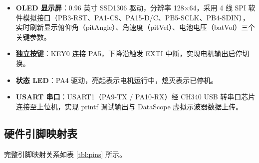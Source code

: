 \documentclass[12pt,a4paper,UTF8]{ctexrep}
\begin{document}
\begin{itemize}
  \item \textbf{OLED 显示屏}：0.96 英寸 SSD1306 驱动，分辨率 128$\times$64，采用 4 线 SPI 软件模拟接口（PB3-RST、PA1-CS、PA15-D/C、PB5-SCLK、PB4-SDIN），实时刷新显示俯仰角（pitAngle）、角速度（pitVel）、电池电压（batVol）三个关键参数。
  \item \textbf{独立按键}：KEY0 连接 PA5，下降沿触发 EXTI 中断，实现电机输出启停切换。
  \item \textbf{状态 LED}：PA4 驱动，亮起表示电机运行中，熄灭表示已停机。
  \item \textbf{USART 串口}：USART1（PA9-TX / PA10-RX）经 CH340 USB 转串口芯片连接至上位机，实现 printf 调试输出与 DataScope 虚拟示波器数据上传。
\end{itemize}

\subsection{硬件引脚映射表}

完整引脚映射关系如表 \ref{tbl:pins} 所示。
\end{document}
